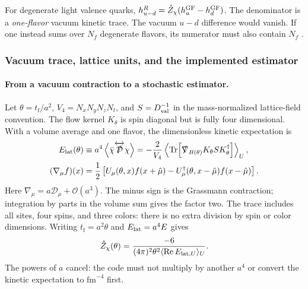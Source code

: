 \documentclass[11pt]{article}
\numberwithin{equation}{section}
\newcommand{\cO}{\mathcal{O}}
\newcommand{\tf}{t_{\mathrm f}}
\DeclareMathOperator{\Tr}{Tr}
\begin{document}
For degenerate light valence quarks, \(h_{u-d}^{R}=\mathring Z_\chi
(h_u^{\rm GF}-h_d^{\rm GF})\). The denominator is a \emph{one-flavor}
vacuum kinetic trace. The vacuum \(u-d\) difference would vanish. If one
instead sums over \(N_f\) degenerate flavors, its numerator must also
contain \(N_f\) \cite{MakinoSuzuki2014}.

\subsubsection{Vacuum trace, lattice units, and the implemented estimator}

\paragraph{From a vacuum contraction to a stochastic estimator.}
Let \(\theta=\tf/a^2\), \(V_4=N_xN_yN_zN_t\), and
\(S=D_{\rm val}^{-1}\) in the mass-normalized lattice-field convention.
The flow kernel \(K_\theta\) is spin diagonal but is fully four dimensional.
With a volume average and one flavor, the dimensionless kinetic expectation is
\begin{align}
 E_{\rm lat}(\theta)
 &\equiv a^4\left\langle\bar\chi
              \overleftrightarrow{\slashed{\mathcal D}}\chi\right\rangle
 =-\frac{2}{V_4}\left\langle
       \Tr\!\left[\slashed\nabla_{B(\theta)}
                   K_\theta S K_\theta^\dagger\right]\right\rangle_U,
 \label{eq:ringed-kinetic-full-trace}\\
 (\nabla_\mu f)(x)
 &=\frac{1}{2}\left[
 U_\mu(\theta,x)f(x+\hat\mu)
 -U_\mu^\dagger(\theta,x-\hat\mu)f(x-\hat\mu)\right].
 \label{eq:ringed-kinetic-lattice-derivative}
\end{align}
Here \(\nabla_\mu=a\mathcal D_\mu+\cO(a^3)\).  The minus sign is the
Grassmann contraction; integration by parts in the volume sum gives the
factor two.  The trace includes all sites, four spins, and three colors:
there is no extra division by spin or color dimensions.
Writing \(\tf=a^2\theta\) and \(E_{\rm lat}=a^4E\) gives
\begin{equation}
 \mathring Z_\chi(\theta)
 =\frac{-6}{(4\pi)^2\theta^2\langle\operatorname{Re}E_{{\rm lat},U}\rangle_U}.
 \label{eq:ringed-lattice-z}
\end{equation}
The powers of \(a\) cancel: the code must not multiply by another \(a^4\)
or convert the kinetic expectation to \(\mathrm{fm}^{-4}\) first.
\end{document}
